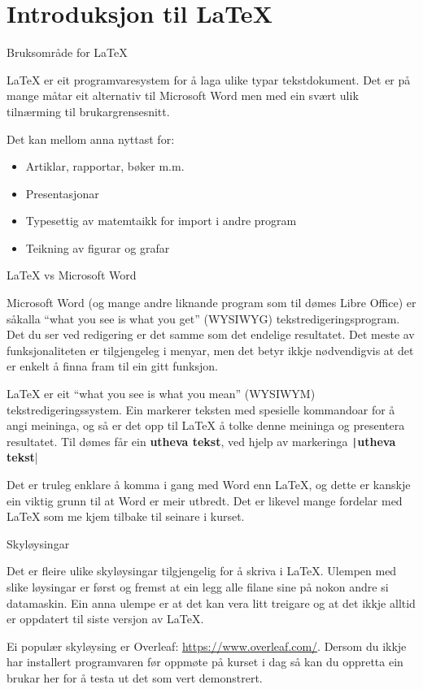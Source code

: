 \section{Introduksjon til \LaTeX}

\begin{frame}{Bruksområde for \LaTeX}
	
	\LaTeX{} er eit programvaresystem for å laga ulike typar tekstdokument. Det er på mange måtar eit alternativ til Microsoft Word men med ein svært ulik tilnærming til brukargrensesnitt.
	
	Det kan mellom anna nyttast for:
	
	\begin{itemize}
		\item Artiklar, rapportar, bøker m.m.
		\item Presentasjonar
		\item Typesettig av matemtaikk for import i andre program
		\item Teikning av figurar og grafar
	\end{itemize}
	
\end{frame}


	\begin{frame}{\LaTeX{} vs Microsoft Word}
	
	Microsoft Word (og mange andre liknande program som til dømes Libre Office) er såkalla ``what you see is what you get'' (WYSIWYG) tekstredigeringsprogram. Det du ser ved redigering er det samme som det endelige resultatet. Det meste av funksjonaliteten er tilgjengeleg i menyar, men det betyr ikkje nødvendigvis at det er enkelt å finna fram til ein gitt funksjon.
	
	\LaTeX{} er eit ``what you see is what you mean'' (WYSIWYM) tekstredigeringssystem. Ein markerer teksten med spesielle kommandoar for å angi meininga, og så er det opp til \LaTeX{} å tolke denne meininga og presentera resultatet. Til dømes får ein \textbf{utheva tekst}, ved hjelp av markeringa \texttt|\textbf{utheva tekst}|
	
	Det er truleg enklare å komma i gang med Word enn \LaTeX{}, og dette er kanskje ein viktig grunn til at Word er meir utbredt. Det er likevel mange fordelar med \LaTeX{} som me kjem tilbake til seinare i kurset.
	
\end{frame}

\begin{frame}{Skyløysingar}
	
	Det er fleire ulike skyløysingar tilgjengelig for å skriva i \LaTeX. Ulempen med slike løysingar er først og fremst at ein legg alle filane sine på nokon andre si datamaskin. Ein anna ulempe er at det kan vera litt treigare og at det ikkje alltid er oppdatert til siste versjon av \LaTeX.
	
	Ei populær skyløysing er Overleaf: \url{https://www.overleaf.com/}. Dersom du ikkje har installert programvaren før oppmøte på kurset i dag så kan du oppretta ein brukar her for å testa ut det som vert demonstrert.
	
\end{frame}



